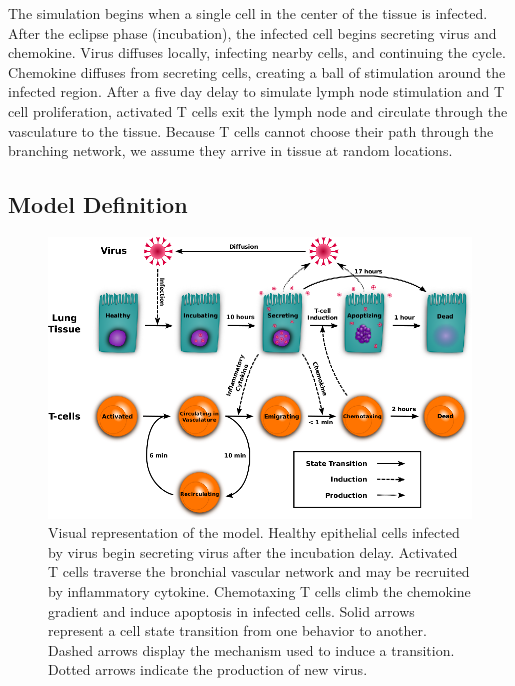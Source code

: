 \documentclass[10pt]{article}
\begin{document}
The simulation begins when a single cell in the center of the tissue is infected. After the eclipse phase (incubation), the infected cell begins secreting virus and chemokine. Virus diffuses locally, infecting nearby cells, and continuing the cycle. Chemokine diffuses from secreting cells, creating a ball of stimulation around the infected region. After a five day delay to simulate lymph node stimulation and T cell proliferation, activated T cells exit the lymph node and circulate through the vasculature to the tissue. Because T  cells cannot choose their path through the branching network, we assume they arrive in tissue at random locations. 


\subsection*{Model Definition}

\begin{figure}[ht!]
\begin{center}
\includegraphics[width=\textwidth]{ModelChart}
\end{center}
\caption{Visual representation of the model.  Healthy epithelial cells infected by virus begin secreting virus after the incubation delay.  Activated T cells traverse the bronchial vascular network and may be recruited by inflammatory cytokine.  Chemotaxing T cells climb the chemokine gradient and induce apoptosis in infected cells.  Solid arrows represent a cell state transition from one behavior to another.  Dashed arrows display the mechanism used to induce a transition.  Dotted arrows indicate the production of new virus.}
\label{fig:modelchart}
\end{figure}
\end{document}
